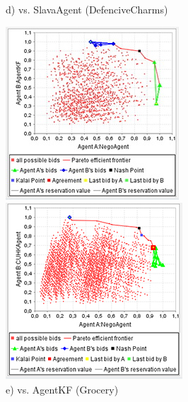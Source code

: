 \documentclass[html]{report}    %
\begin{document}
\begin{figure}[htbp]
\begin{minipage}{.3\textwidth}
		\caption*{d) vs. SlavaAgent (DefenciveCharms)}
	\end{minipage}
	\begin{minipage}{.3\textwidth}
		\centering
		\includegraphics[width=.9\linewidth]{5}
		\caption*{e) vs. AgentKF (Grocery)}
	\end{minipage}
	\begin{minipage}{.3\textwidth}
		\centering
		\includegraphics[width=.9\linewidth]{6}

\end{minipage}
\end{figure}
\end{document}
